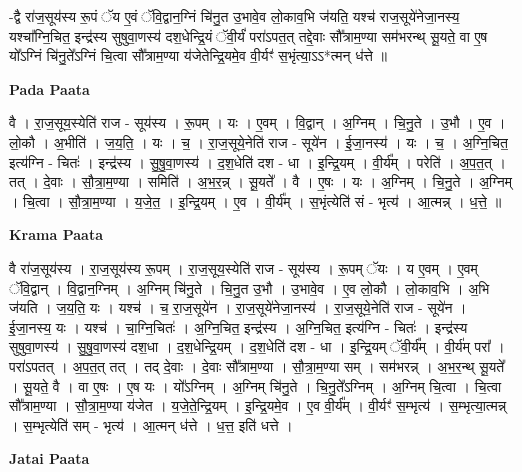 \documentclass[17pt]{extarticle}
\begin{document}
-द्वै रा॑ज॒सूय॑स्य रू॒पं ॅय ए॒वं ॅवि॒द्वान॒ग्निं चि॑नु॒त उ॒भावे॒व लो॒काव॒भि ज॑यति॒ यश्च॑ राज॒सूये॑नेजा॒नस्य॒ यश्चा᳚ग्नि॒चित॒ इन्द्र॑स्य सुषुवा॒णस्य॑ दश॒धेन्द्रि॒यं ॅवी॒र्यं॑ परा॑ऽपत॒त् तद्दे॒वाः सौ᳚त्राम॒ण्या सम॑भरन्थ् सू॒यते॒ वा ए॒ष यो᳚ऽग्निं चि॑नु॒ते᳚ऽग्निं चि॒त्वा सौ᳚त्राम॒ण्या य॑जेतेन्द्रि॒यमे॒व वी॒र्यꣳ॑ स॒भृंत्या॒ऽऽ*त्मन् ध॑त्ते ॥ \newline

\textbf{Pada Paata} \newline

वै । रा॒ज॒सूय॒स्येति॑ राज - सूय॑स्य । रू॒पम् । यः । ए॒वम् । वि॒द्वान् । अ॒ग्निम् । चि॒नु॒ते । उ॒भौ । ए॒व ।   लो॒कौ । अ॒भीति॑ । ज॒य॒ति॒ । यः । च॒ । रा॒ज॒सूये॒नेति॑ राज - सूये॑न । ई॒जा॒नस्य॑ । यः । च॒ । अ॒ग्नि॒चित॒ इत्य॑ग्नि - चितः॑ । इन्द्र॑स्य । सु॒षु॒वा॒णस्य॑ । द॒श॒धेति॑ दश - धा । इ॒न्द्रि॒यम् । वी॒र्य᳚म् । परेति॑ । अ॒प॒त॒त् । तत् । दे॒वाः । सौ॒त्रा॒म॒ण्या । समिति॑ । अ॒भ॒र॒न्न् । सू॒यते᳚ । वै । ए॒षः । यः । अ॒ग्निम् । चि॒नु॒ते । अ॒ग्निम् । चि॒त्वा । सौ॒त्रा॒म॒ण्या । य॒जे॒त॒ । इ॒न्द्रि॒यम् । ए॒व । वी॒र्य᳚म् । स॒भृंत्येति॑ सं - भृत्य॑ । आ॒त्मन्न् । ध॒त्ते॒ ॥  \newline


\textbf{Krama Paata} \newline

वै रा॑ज॒सूय॑स्य । रा॒ज॒सूय॑स्य रू॒पम् । रा॒ज॒सूय॒स्येति॑ राज - सूय॑स्य । रू॒पम् ॅयः । य ए॒वम् । ए॒वम् ॅवि॒द्वान् । वि॒द्वान॒ग्निम् । अ॒ग्निम् चि॑नु॒ते । चि॒नु॒त उ॒भौ । उ॒भावे॒व । ए॒व लो॒कौ । लो॒काव॒भि । अ॒भि ज॑यति । ज॒य॒ति॒ यः । यश्च॑ । च॒ रा॒ज॒सूये॑न । रा॒ज॒सूये॑नेजा॒नस्य॑ । रा॒ज॒सूये॒नेति॑ राज - सूये॑न । ई॒जा॒नस्य॒ यः । यश्च॑ । चा॒ग्नि॒चितः॑ । अ॒ग्नि॒चित॒ इन्द्र॑स्य । अ॒ग्नि॒चित॒ इत्य॑ग्नि - चितः॑ । इन्द्र॑स्य सुषुवा॒णस्य॑ । सु॒षु॒वा॒णस्य॑ दश॒धा । द॒श॒धेन्द्रि॒यम् । द॒श॒धेति॑ दश - धा । इ॒न्द्रि॒यम् ॅवी॒र्य᳚म् । वी॒र्य॑म् परा᳚ । परा॑ऽपतत् । अ॒प॒त॒त् तत् । तद् दे॒वाः । दे॒वाः सौ᳚त्राम॒ण्या । सौ॒त्रा॒म॒ण्या सम् । सम॑भरन्न् । अ॒भ॒र॒न्थ् सू॒यते᳚ । सू॒यते॒ वै । वा ए॒षः । ए॒ष यः । यो᳚ऽग्निम् । अ॒ग्निम् चि॑नु॒ते । चि॒नु॒ते᳚ऽग्निम् । अ॒ग्निम् चि॒त्वा । चि॒त्वा सौ᳚त्राम॒ण्या । सौ॒त्रा॒म॒ण्या य॑जेत । य॒जे॒ते॒न्द्रि॒यम् । इ॒न्द्रि॒यमे॒व । ए॒व वी॒र्य᳚म् । वी॒र्यꣳ॑ स॒म्भृत्य॑ । स॒म्भृत्या॒त्मन्न् । स॒म्भृत्येति॑ सम् - भृत्य॑ । आ॒त्मन् ध॑त्ते । ध॒त्त॒ इति॑ धत्ते । \newline

\textbf{Jatai Paata} \newline
\end{document}

